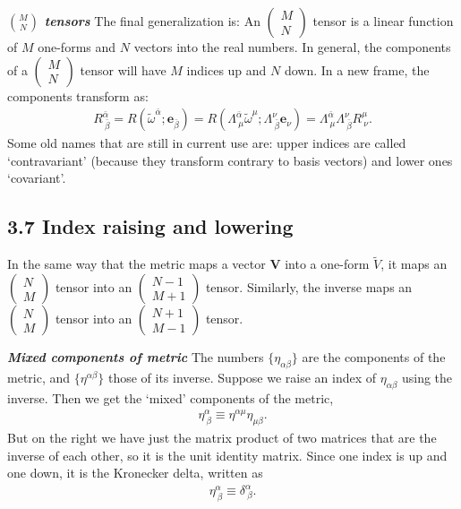 \documentclass[11pt,letterpaper]{book}
\begin{document}
    \textit{\textbf{\(\binom{M}{N}\) tensors}}
    The final generalization is:
    An \(\left(\begin{array}{c} M \\ N \end{array}\right)\) tensor is a linear function of \(M\) one-forms and \(N\) vectors into the real numbers.
    In general, the components of a \(\left(\begin{array}{c} M \\ N \end{array}\right)\) tensor will have \(M\) indices up and \(N\) down. In a new frame, the components transform as:
    \begin{align}
    R^{\bar{\alpha}}_{\ \bar{\beta}} = R(\tilde{\omega}^{\bar{\alpha}}; \mathbf{e}_{\bar{\beta}})
    = R\left(\Lambda^{\bar{\alpha}}_{\ \mu} \tilde{\omega}^{\mu}; \Lambda^{\nu}_{\ \bar{\beta}} \mathbf{e}_{\nu}\right)
    = \Lambda^{\bar{\alpha}}_{\ \mu} \Lambda^{\nu}_{\ \bar{\beta}} R^{\mu}_{\ \nu}. \tag{3.55}
    \end{align}
    Some old names that are still in current use are: upper indices are called ‘contravariant’ (because they transform contrary to basis vectors) and lower ones ‘covariant’.

    \subsection{3.7 Index raising and lowering}
    In the same way that the metric maps a vector \(\mathbf{V}\) into a one-form \(\tilde{V}\), it maps an \(\left(\begin{array}{c} N \\ M \end{array}\right)\) tensor into an \(\left(\begin{array}{c} N-1 \\ M+1 \end{array}\right)\) tensor. Similarly, the inverse maps an \(\left(\begin{array}{c} N \\ M \end{array}\right)\) tensor into an \(\left(\begin{array}{c} N+1 \\ M-1 \end{array}\right)\) tensor.

    \textit{\textbf{Mixed components of metric}}
    The numbers \(\{\eta_{\alpha\beta}\}\) are the components of the metric, and \(\{\eta^{\alpha\beta}\}\) those of its inverse. Suppose we raise an index of \(\eta_{\alpha\beta}\) using the inverse. Then we get the ‘mixed’ components of the metric,
    \begin{align}
    \eta^\alpha_{\ \beta} \equiv \eta^{\alpha\mu} \eta_{\mu\beta}. \tag{3.59}
    \end{align}
    But on the right we have just the matrix product of two matrices that are the inverse of each other, so it is the unit identity matrix. Since one index is up and one down, it is the Kronecker delta, written as
    \begin{align}
    \eta^\alpha_{\ \beta} \equiv \delta^\alpha_{\ \beta}. \tag{3.60}
    \end{align}
\end{document}
